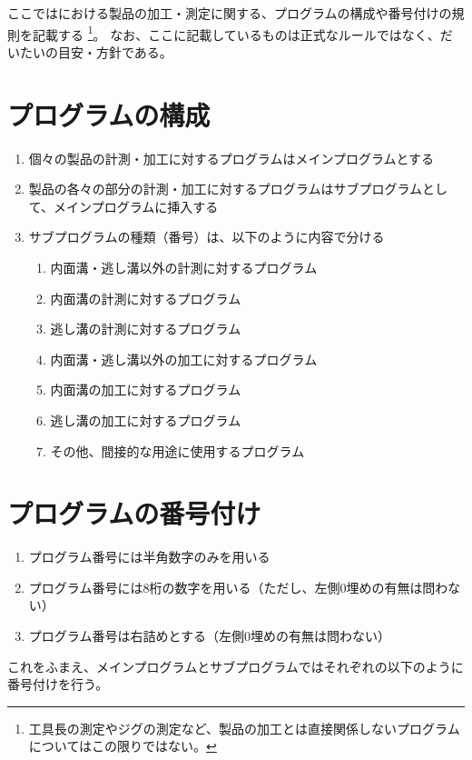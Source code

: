 
ここでは\DMname における製品の加工・測定に関する、プログラムの構成や番号付けの規則を記載する
\footnote{工具長の測定やジグの測定など、製品の加工とは直接関係しないプログラムについてはこの限りではない。}。
なお、ここに記載しているものは正式なルールではなく、だいたいの目安・方針である。


\section{プログラムの構成}
\begin{enumerate}
\item 個々の製品の計測・加工に対するプログラムはメインプログラムとする
\item 製品の各々の部分の計測・加工に対するプログラムはサブプログラムとして、メインプログラムに挿入する
\item サブプログラムの種類（番号）は、以下のように内容で分ける
  \begin{enumerate}
  \item 内面溝・逃し溝以外の計測に対するプログラム
  \item 内面溝の計測に対するプログラム
  \item 逃し溝の計測に対するプログラム
  \item 内面溝・逃し溝以外の加工に対するプログラム
  \item 内面溝の加工に対するプログラム
  \item 逃し溝の加工に対するプログラム
  \item その他、間接的な用途に使用するプログラム
  \end{enumerate}
\end{enumerate}



\section{プログラムの番号付け}
\begin{enumerate}
\item プログラム番号には半角数字のみを用いる
\item プログラム番号には8桁の数字を用いる（ただし、左側0埋めの有無は問わない）
\item プログラム番号は右詰めとする（左側0埋めの有無は問わない）
\end{enumerate}
これをふまえ、メインプログラムとサブプログラムではそれぞれの以下のように番号付けを行う。



